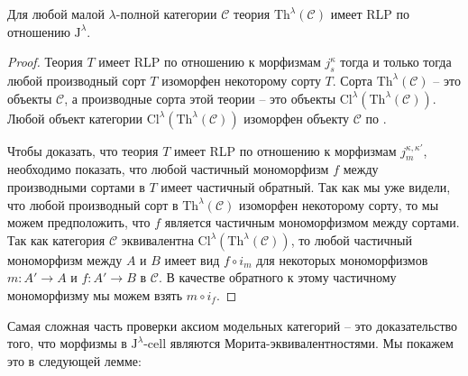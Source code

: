 \documentclass[reqno]{amsart}
\theoremstyle{definition}
\theoremstyle{remark}
\newcommand{\cat}[1]{\mathcal{#1}}
\newcommand{\fs}[1]{\mathrm{#1}}
\newcommand{\I}{\mathrm{I}}
\newcommand{\J}{\mathrm{J}}
\newcommand{\class}[2]{#1\text{-}\mathrm{#2}}
\newcommand{\Icell}[1][\I]{\class{#1}{cell}}
\begin{document}
\begin{prop}[th-fib]
Для любой малой $\lambda$-полной категории $\cat{C}$ теория $\fs{Th}^\lambda(\cat{C})$ имеет RLP по отношению $\J^\lambda$.
\end{prop}
\begin{proof}
Теория $T$ имеет RLP по отношению к морфизмам $j^\kappa_s$ тогда и только тогда любой производный сорт $T$ изоморфен некоторому сорту $T$.
Сорта $\fs{Th}^\lambda(\cat{C})$ -- это объекты $\cat{C}$, а производные сорта этой теории -- это объекты $\fs{Cl}^\lambda(\fs{Th}^\lambda(\cat{C}))$.
Любой объект категории $\fs{Cl}^\lambda(\fs{Th}^\lambda(\cat{C}))$ изоморфен объекту $\cat{C}$ по .

Чтобы доказать, что теория $T$ имеет RLP по отношению к морфизмам $j_m^{\kappa,\kappa'}$, необходимо показать, что любой частичный мономорфизм $f$ между производными сортами в $T$ имеет частичный обратный.
Так как мы уже видели, что любой производный сорт в $\fs{Th}^\lambda(\cat{C})$ изоморфен некоторому сорту, то мы можем предположить, что $f$ является частичным мономорфизмом между сортами.
Так как категория $\cat{C}$ эквивалентна $\fs{Cl}^\lambda(\fs{Th}^\lambda(\cat{C}))$, то любой частичный мономорфизм между $A$ и $B$ имеет вид $f \circ i_m$ для некоторых мономорфизмов $m : A' \to A$ и $f : A' \to B$ в $\cat{C}$.
В качестве обратного к этому частичному мономорфизму мы можем взять $m \circ i_f$.
\end{proof}

Самая сложная часть проверки аксиом модельных категорий -- это доказательство того, что морфизмы в $\Icell[\J^\lambda]$ являются Морита-эквивалентностями.
Мы покажем это в следующей лемме:
\end{document}
